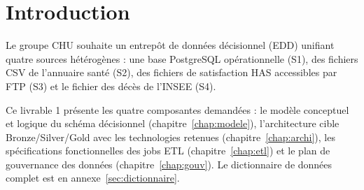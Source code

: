 \chapter{Introduction}\label{chap:intro}
Le groupe CHU souhaite un entrepôt de données décisionnel (EDD) unifiant quatre sources hétérogènes : une base PostgreSQL opérationnelle (S1), des fichiers CSV de l'annuaire santé (S2), des fichiers de satisfaction HAS accessibles par FTP (S3) et le fichier des décès de l'INSEE (S4).

Ce livrable 1 présente les quatre composantes demandées : le modèle conceptuel et logique du schéma décisionnel (chapitre~\ref{chap:modele}), l'architecture cible Bronze/Silver/Gold avec les technologies retenues (chapitre~\ref{chap:archi}), les spécifications fonctionnelles des jobs ETL (chapitre~\ref{chap:etl}) et le plan de gouvernance des données (chapitre~\ref{chap:gouv}). Le dictionnaire de données complet est en annexe~\ref{sec:dictionnaire}.
